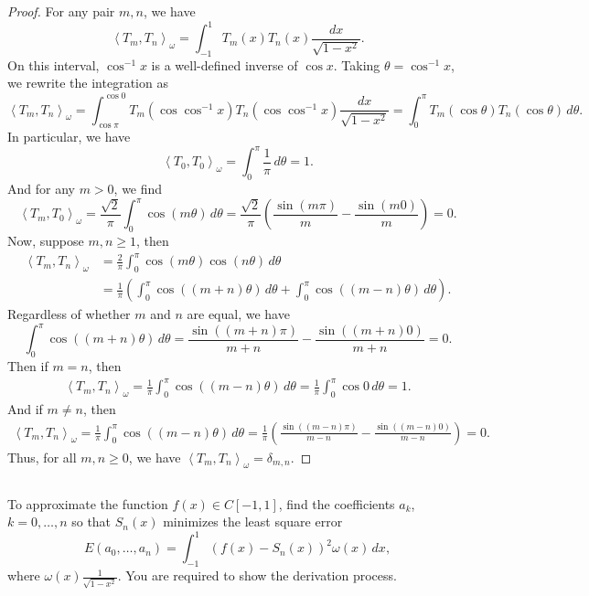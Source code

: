 \documentclass[12pt]{article}
\newenvironment{problem}
    {\begin{lrbox}{\mybox}\begin{minipage}{0.98\textwidth}}
    {\end{minipage}\end{lrbox}\framebox[\textwidth]{\usebox{\mybox}}}
\newcommand{\<}{\left\langle}
\renewcommand{\>}{\right\rangle}
\begin{document}
\begin{proof}
    For any pair $m, n$, we have
    \[
        \< T_m, T_n\>_\omega = \int_{-1}^1 T_m(x) T_n(x) \frac{dx}{\sqrt{1- x^2}}.
    \]
    On this interval, $\cos^{-1} x$ is a well-defined inverse of $\cos x$. Taking $\theta = \cos^{-1} x$, we rewrite the integration as
    \[
        \< T_m, T_n\>_\omega
            = \int_{\cos \pi}^{\cos{0}} T_m(\cos \cos^{-1} x) T_n(\cos \cos^{-1} x) \frac{dx}{\sqrt{1- x^2}}
            = \int_0^\pi T_m(\cos \theta) T_n(\cos \theta) \,d\theta.
    \]
    In particular, we have
    \[
        \< T_0, T_0\>_\omega
            = \int_0^\pi \frac{1}{\pi} \,d\theta
            = 1.
    \]
    And for any $m > 0$, we find
    \[
        \< T_m, T_0\>_\omega
            = \frac{\sqrt{2}}{\pi} \int_0^\pi \cos(m \theta) \,d\theta
            = \frac{\sqrt{2}}{\pi} \left( \frac{\sin(m\pi)}{m} - \frac{\sin(m0)}{m} \right)
            = 0.
    \]
    Now, suppose $m, n \geq 1$, then
    \begin{align*}
        \< T_m, T_n\>_\omega
            &= \frac{2}{\pi}\int_0^\pi \cos(m\theta) \cos(n\theta) \,d\theta \\
            &= \frac{1}{\pi} \left( \int_0^\pi \cos((m+n)\theta) \,d\theta + \int_0^\pi \cos((m-n)\theta) \,d\theta \right).
    \end{align*}
    Regardless of whether $m$ and $n$ are equal, we have
    \[
        \int_0^\pi \cos((m+n)\theta) \,d\theta = \frac{\sin((m+n)\pi)}{m+n} - \frac{\sin((m+n)0)}{m+n} = 0.
    \]
    Then if $m = n$, then
    \begin{align*}
        \< T_m, T_n\>_\omega
            = \frac{1}{\pi} \int_0^\pi \cos((m-n)\theta) \,d\theta 
            = \frac{1}{\pi} \int_0^\pi \cos0 \,d\theta
            = 1.
    \end{align*}
    And if $m \ne n$, then
    \begin{align*}
        \< T_m, T_n\>_\omega
            = \frac{1}{\pi} \int_0^\pi \cos((m-n)\theta) \,d\theta 
            = \frac{1}{\pi} \left( \frac{\sin((m-n)\pi)}{m-n} - \frac{\sin((m-n)0)}{m-n} \right)
            = 0.
    \end{align*}
    Thus, for all $m, n \geq 0$, we have $\< T_m, T_n\>_\omega = \delta_{m,n}$.
    
\end{proof}


\subsection{}
\begin{problem}
    To approximate the function $f(x) \in C[-1, 1]$, find the coefficients $a_k$, $k = 0, \dots, n$ so that $S_n(x)$ minimizes the least square error
    \[
        E(a_0, \dots, a_n) = \int_{-1}^1 (f(x) - S_n(x))^2 \omega(x) \,dx,
    \]
    where $\omega(x) \frac{1}{\sqrt{1- x^2}}$. You are required to show the derivation process.
\end{problem}
\medskip
\end{document}
